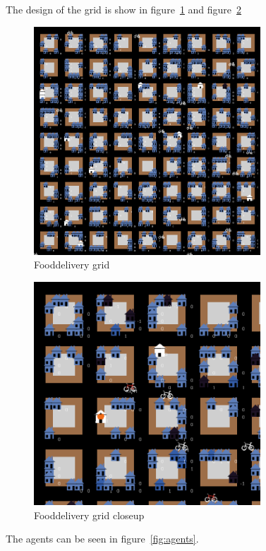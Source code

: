 The design of the grid is show in figure~\ref{fig:grid} and figure~\ref{fig:grid closeup}
\begin{figure}
    \centering
    \includegraphics[width=8.5cm]{sections/pics/grid}
    \caption{Fooddelivery grid}
    \label{fig:grid}
\end{figure}
\begin{figure}
    \centering
    \includegraphics[width=8.5cm]{sections/pics/grid_closeup}
    \caption{Fooddelivery grid closeup}
    \label{fig:grid closeup}
\end{figure}
The agents can be seen in figure~\ref{fig:agents}.
